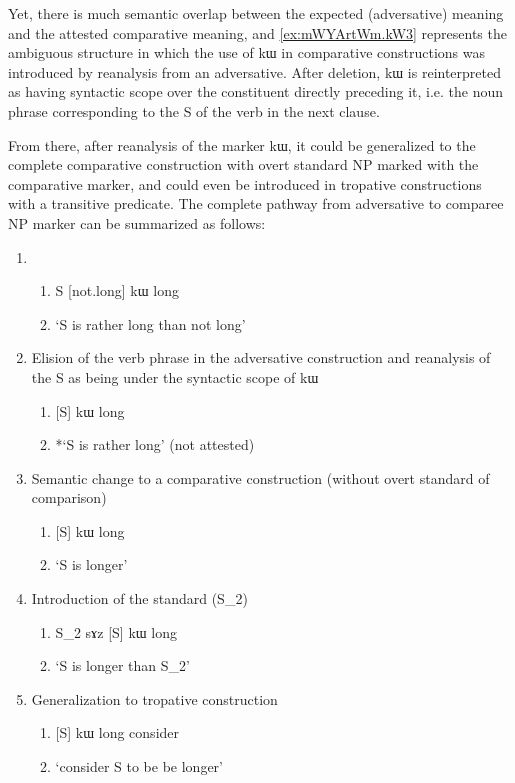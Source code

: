 \documentclass[oldfontcommands,oneside,a4paper,11pt]{article}
\newcommand{\ipa}[1]{{\phon #1}} %
\begin{document}
  
  Yet, there is much semantic overlap   between the expected (adversative) meaning and the attested comparative meaning, and \ref{ex:mWYArtWm.kW3}   represents the ambiguous structure in which the use of \ipa{kɯ} in comparative constructions was introduced by reanalysis from an adversative. After deletion, \ipa{kɯ} is reinterpreted as having syntactic scope over the constituent directly preceding it, i.e. the noun phrase corresponding to the S of the verb in the next clause.
  
  From there, after reanalysis of the marker \ipa{kɯ}, it could be generalized to the complete comparative construction with overt standard NP marked with the comparative marker, and could even be introduced in tropative constructions with a transitive predicate. The complete pathway from adversative to comparee NP marker can be summarized as follows:
  
\begin{enumerate} 
\item 
\begin{enumerate} 
\item S [not.long] \ipa{kɯ} long 
\item `S is rather long than not long'
\end{enumerate} 
\item Elision of the verb phrase in the adversative construction  and reanalysis of the S as being under the syntactic scope of \ipa{kɯ}
\begin{enumerate} 
\item{} [S] \ipa{kɯ} long  
\item *`S is rather long' (not attested)
\end{enumerate} 
\item Semantic change to a comparative construction (without overt standard of comparison)
\begin{enumerate} 
\item{} [S] \ipa{kɯ} long  
\item `S is longer'  
\end{enumerate} 
\item Introduction of the standard (S_2)
\begin{enumerate} 
\item{} S_2 \ipa{sɤz} [S] \ipa{kɯ} long  
\item  `S is longer than S_2'
\end{enumerate} 
\item Generalization to tropative construction
\begin{enumerate} 
\item{}  [S] \ipa{kɯ} long  consider  
\item  `consider S to be be longer'
\end{enumerate} 
 
\end{enumerate}
  
\end{document}
